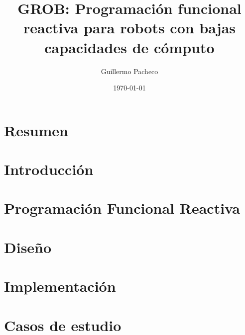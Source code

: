 \documentclass[12pt,a4paper,spanish]{book}
\begin{document}
\title{GROB: Programación funcional reactiva para robots con bajas capacidades de cómputo}
\author{Guillermo Pacheco}
\date{\today}

\maketitle


\chapter*{Resumen}



\cleardoublepage
{} %
\tableofcontents

\cleardoublepage
{} %
\listoffigures

\cleardoublepage
{} %
\listoftables

\chapter{Introducción}


\chapter{Programación Funcional Reactiva}


\chapter{Diseño}


\chapter{Implementación}


\chapter{Casos de estudio}

\end{document}
